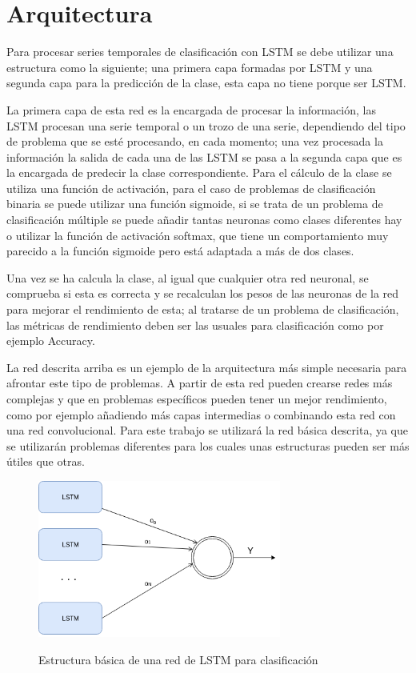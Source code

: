 \section{Arquitectura}
Para procesar series temporales de clasificación con LSTM se debe utilizar una estructura como la siguiente; una primera capa formadas por LSTM y una segunda capa para la predicción de la clase, esta capa no tiene porque ser LSTM.\newline

La primera capa de esta red es la encargada de procesar la información, las LSTM procesan una serie temporal o un trozo de una serie, dependiendo del tipo de problema que se esté procesando, en cada momento; una vez procesada la información la salida de cada una de las LSTM se pasa a la segunda capa que es la encargada de predecir la clase correspondiente. Para el cálculo de la clase se utiliza una función de activación, para el caso de problemas de clasificación binaria se puede utilizar una función sigmoide, si se trata de un problema de clasificación múltiple se puede añadir tantas neuronas como clases diferentes hay o utilizar la función de activación softmax, que tiene un comportamiento muy parecido a la función sigmoide pero está adaptada a más de dos clases.\newline

Una vez se ha calcula la clase, al igual que cualquier otra red neuronal,  se comprueba si esta es correcta y se recalculan los pesos de las neuronas de la red para mejorar el rendimiento de esta; al tratarse de un problema de clasificación, las métricas de rendimiento deben ser las usuales para clasificación como por ejemplo Accuracy.\newline

La red descrita arriba es un ejemplo de la arquitectura más simple necesaria para afrontar este tipo de problemas. A partir de esta red pueden crearse redes más complejas y que en problemas específicos pueden tener un mejor rendimiento, como por ejemplo añadiendo más capas intermedias o combinando esta red con una red convolucional.\newline
\newpage
Para este trabajo se utilizará la red básica descrita, ya que se utilizarán problemas diferentes para los cuales unas estructuras pueden ser más útiles que otras.

\begin{figure}[h]
	\centering
	\includegraphics[width=80mm]{imagenes/arquitectura_base.png}
	\label{fig:10}
	\caption{Estructura básica de una red de LSTM para clasificación}
\end{figure}
\verticalspace

